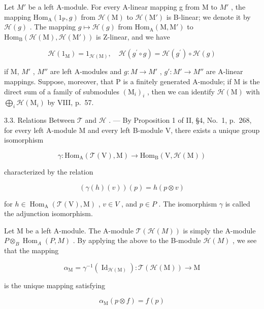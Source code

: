 Let \(M'\) be a left A-module. For every A-linear mapping g from M to \(M'\) , the mapping \(\mathrm{Hom}_{\mathrm{A}}(1_{\mathrm{P}}, g)\) from \(\mathcal{H}(\mathrm{M})\) to \(\mathcal{H}(\mathrm{M}')\) is B-linear; we denote it by \(\mathcal{H}(g)\) . The mapping \(g \mapsto \mathcal{H}(g)\) from \(\mathrm{Hom}_{\mathrm{A}}(\mathrm{M}, \mathrm{M}')\) to \(\mathrm{Hom}_{\mathrm{B}}(\mathcal{H}(\mathrm{M}), \mathcal{H}(\mathrm{M}'))\) is Z-linear, and we have

\[
\mathcal {H} (1 _ {\mathrm{M}}) = 1 _ {\mathcal {H} (\mathrm{M})}, \quad \mathcal {H} (g ^ {\prime} \circ g) = \mathcal {H} (g ^ {\prime}) \circ \mathcal {H} (g)\tag{4}
\]

if M, \(M'\) , \(M''\) are left A-modules and \(g : M \to M'\) , \(g' : M' \to M''\) are A-linear mappings. Suppose, moreover, that P is a finitely generated A-module; if M is the direct sum of a family of submodules \((\mathrm{M}_{i})_{i}\) , then we can identify \(\mathcal{H}(\mathrm{M})\) with \(\bigoplus_{i} \mathcal{H}(\mathrm{M}_{i})\) by VIII, p.~57.

3.3. Relations Between \(\mathcal{T}\) and \(\mathcal{H}\) . --- By Proposition 1 of II, §4, No.~1, p.~268, for every left A-module M and every left B-module V, there exists a unique group isomorphism

\[
\gamma : \mathrm{Hom} _ {\mathrm{A}} (\mathcal {T} (\mathrm{V}), \mathrm{M}) \longrightarrow \mathrm{Hom} _ {\mathrm{B}} (\mathrm{V}, \mathcal {H} (\mathrm{M}))\tag{5}
\]

characterized by the relation

\[
(\gamma (h) (v)) (p) = h (p \otimes v)\tag{6}
\]

for \(h \in \operatorname{Hom}_{\mathrm{A}}(\mathcal{T}(\mathrm{V}), \mathrm{M})\) , \(v \in V\) , and \(p \in P\) . The isomorphism \(\gamma\) is called the adjunction isomorphism.

Let M be a left A-module. The A-module \(\mathcal{T}(\mathcal{H}(M))\) is simply the A-module \(P \otimes_{B} \operatorname{Hom}_{A}(P, M)\) . By applying the above to the B-module \(\mathcal{H}(M)\) , we see that the mapping

\[
\alpha_ {\mathrm{M}} = \gamma^ {- 1} (\operatorname{Id} _ {\mathcal {H} (\mathrm{M})}): \mathcal {T} (\mathcal {H} (\mathrm{M})) \longrightarrow \mathrm{M}
\]

is the unique mapping satisfying

\[
\alpha_ {\mathrm{M}} (p \otimes f) = f (p)\tag{7}
\]

